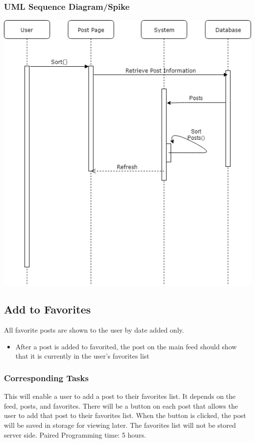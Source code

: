 \documentclass[12pt]{article}
\begin{document}
\subsubsection{UML Sequence Diagram/Spike}
\includegraphics[scale=0.5]{img/7.png}\linebreak

\subsection{Add to Favorites}
All favorite posts are shown to the user by date added only.
\begin{itemize}
  \item After a post is added to favorited, the post on the main feed should show that
it is currently in the user’s favorites list
\end{itemize}
\subsubsection{Corresponding Tasks}
	This will enable a user to add a post to their favorites list.  It depends on the feed, posts, and favorites.  There will be a button on each post that allows the user to add that post to their favorites list.  When the button is clicked, the post will be saved in storage for viewing later.  The favorites list will not be stored server side. Paired Programming time: 5 hours.
\end{document}

